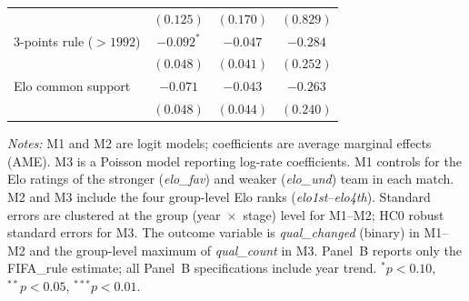 \begin{table}[H]
\begin{threeparttable}
\begin{tabular}{l cc cc cc}
                        & \multicolumn{2}{c}{$(0.125)$} & \multicolumn{2}{c}{$(0.170)$} & \multicolumn{2}{c}{$(0.829)$} \\
3-points rule ($> 1992$) & \multicolumn{2}{c}{$-0.092^{*}$} & \multicolumn{2}{c}{$-0.047$} & \multicolumn{2}{c}{$-0.284$} \\
                        & \multicolumn{2}{c}{$(0.048)$} & \multicolumn{2}{c}{$(0.041)$} & \multicolumn{2}{c}{$(0.252)$} \\
Elo common support      & \multicolumn{2}{c}{$-0.071$} & \multicolumn{2}{c}{$-0.043$} & \multicolumn{2}{c}{$-0.263$} \\
                        & \multicolumn{2}{c}{$(0.048)$} & \multicolumn{2}{c}{$(0.044)$} & \multicolumn{2}{c}{$(0.240)$} \\
\bottomrule
\end{tabular}
\begin{tablenotes}
\small
\item \textit{Notes:} M1 and M2 are logit models; coefficients are average marginal effects (AME). M3 is a Poisson model reporting log-rate coefficients. M1 controls for the Elo ratings of the stronger (\textit{elo\_fav}) and weaker (\textit{elo\_und}) team in each match. M2 and M3 include the four group-level Elo ranks (\textit{elo1st}--\textit{elo4th}). Standard errors are clustered at the group (year~$\times$~stage) level for M1--M2; HC0 robust standard errors for M3. The outcome variable is \textit{qual\_changed} (binary) in M1--M2 and the group-level maximum of \textit{qual\_count} in M3. Panel~B reports only the FIFA\_rule estimate; all Panel~B specifications include year trend. $^{*}p<0.10$, $^{**}p<0.05$, $^{***}p<0.01$.
\end{tablenotes}
\end{threeparttable}
\end{table}
